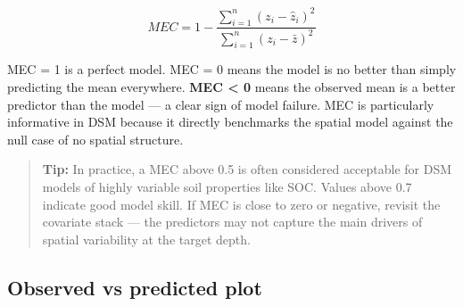 \documentclass[
  10pt,
  b5paper,
  oneside]{book}
\newenvironment{Shaded}{\begin{snugshade}}{\end{snugshade}}
\newcommand{\AttributeTok}[1]{\textcolor[rgb]{0.13,0.29,0.53}{#1}}
\newcommand{\DecValTok}[1]{\textcolor[rgb]{0.00,0.00,0.81}{#1}}
\newcommand{\FloatTok}[1]{\textcolor[rgb]{0.00,0.00,0.81}{#1}}
\newcommand{\FunctionTok}[1]{\textcolor[rgb]{0.13,0.29,0.53}{\textbf{#1}}}
\newcommand{\NormalTok}[1]{#1}
\newcommand{\OtherTok}[1]{\textcolor[rgb]{0.56,0.35,0.01}{#1}}
\newcommand{\SpecialCharTok}[1]{\textcolor[rgb]{0.81,0.36,0.00}{\textbf{#1}}}
\newcommand{\StringTok}[1]{\textcolor[rgb]{0.31,0.60,0.02}{#1}}
\begin{document}
\[MEC = 1 - \frac{\sum_{i=1}^{n}(z_i - \hat{z}_i)^2}{\sum_{i=1}^{n}(z_i - \bar{z})^2}\]

MEC = 1 is a perfect model. MEC = 0 means the model is no better than simply predicting the mean everywhere. \textbf{MEC \textless{} 0} means the observed mean is a better predictor than the model --- a clear sign of model failure. MEC is particularly informative in DSM because it directly benchmarks the spatial model against the null case of no spatial structure.

\begin{quote}
\textbf{Tip:} In practice, a MEC above 0.5 is often considered acceptable for DSM models of highly variable soil properties like SOC. Values above 0.7 indicate good model skill. If MEC is close to zero or negative, revisit the covariate stack --- the predictors may not capture the main drivers of spatial variability at the target depth.
\end{quote}

\subsection*{Observed vs predicted plot}\label{observed-vs-predicted-plot}

\begin{Shaded}
\end{Shaded}
\end{document}
